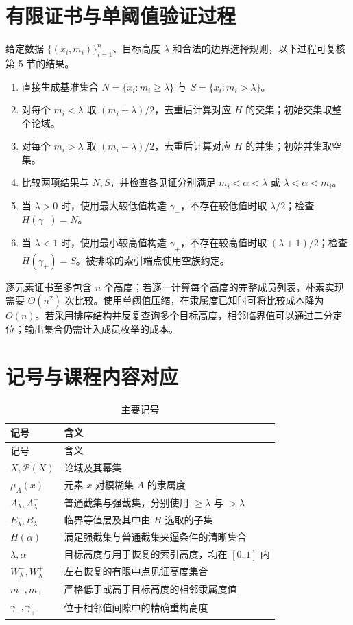 \documentclass[UTF8,fontset=fandol,zihao=-4,a4paper]{ctexart}
\numberwithin{equation}{section}
\theoremstyle{reportplain}
\newcommand{\Pow}{\mathcal P}
\newcommand{\set}[1]{\{#1\}}
\begin{document}
\section{有限证书与单阈值验证过程}
给定数据 $\set{(x_i,m_i)}_{i=1}^{n}$、目标高度 $\lambda$ 和合法的边界选择规则，以下过程可复核第 5 节的结果。
\begin{enumerate}[label=\arabic*.,leftmargin=2.4em,itemsep=3pt]
\item 直接生成基准集合 $N=\set{x_i:m_i\ge\lambda}$ 与 $S=\set{x_i:m_i>\lambda}$。
\item 对每个 $m_i<\lambda$ 取 $(m_i+\lambda)/2$，去重后计算对应 $H$ 的交集；初始交集取整个论域。
\item 对每个 $m_i>\lambda$ 取 $(m_i+\lambda)/2$，去重后计算对应 $H$ 的并集；初始并集取空集。
\item 比较两项结果与 $N,S$，并检查各见证分别满足 $m_i<\alpha<\lambda$ 或 $\lambda<\alpha<m_i$。
\item 当 $\lambda>0$ 时，使用最大较低值构造 $\gamma_-$，不存在较低值时取 $\lambda/2$；检查 $H(\gamma_-)=N$。
\item 当 $\lambda<1$ 时，使用最小较高值构造 $\gamma_+$，不存在较高值时取 $(\lambda+1)/2$；检查 $H(\gamma_+)=S$。被排除的索引端点使用空族约定。
\end{enumerate}

逐元素证书至多包含 $n$ 个高度；若逐一计算每个高度的完整成员列表，朴素实现需要 $O(n^2)$ 次比较。使用单阈值压缩，在隶属度已知时可将比较成本降为 $O(n)$。若采用排序结构并反复查询多个目标高度，相邻临界值可以通过二分定位；输出集合仍需计入成员枚举的成本。

\section{记号与课程内容对应}
\begin{longtable}{p{2.7cm}p{10.2cm}}
\caption{主要记号}\label{tab:notation}\\
\toprule 记号 & 含义\\\midrule\endfirsthead
\toprule 记号 & 含义\\\midrule\endhead
$X,\Pow(X)$ & 论域及其幂集\\
$\mu_A(x)$ & 元素 $x$ 对模糊集 $A$ 的隶属度\\
$A_\lambda,A_\lambda^+$ & 普通截集与强截集，分别使用 $\ge\lambda$ 与 $>\lambda$\\
$E_\lambda,B_\lambda$ & 临界等值层及其中由 $H$ 选取的子集\\
$H(\alpha)$ & 满足强截集与普通截集夹逼条件的清晰集合\\
$\lambda,\alpha$ & 目标高度与用于恢复的索引高度，均在 $[0,1]$ 内\\
$W^-_\lambda,W^+_\lambda$ & 左右恢复的有限中点见证高度集合\\
$m_-,m_+$ & 严格低于或高于目标高度的相邻隶属度值\\
$\gamma_-,\gamma_+$ & 位于相邻值间隙中的精确重构高度\\
\bottomrule
\end{longtable}
\end{document}
